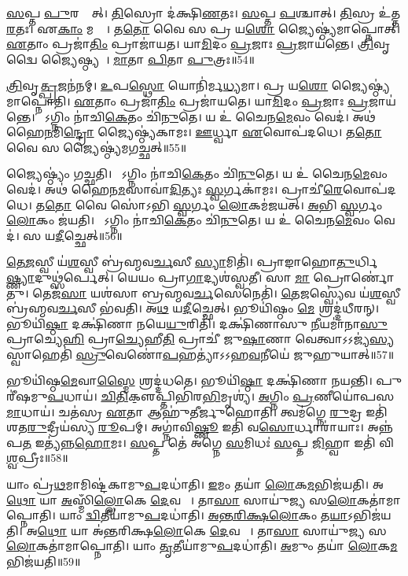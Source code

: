    \ul{𑌸}𑌪𑍍𑌤 \ul{𑌪𑍁}𑌰𑌸𑍍𑌤𑌾᳚𑌤𑍍।
   \ul{𑌤𑌿}𑌸𑍍𑌰𑍋 𑌦॑𑌕𑍍𑌷𑌿\ul{𑌣}𑌤𑌃।
   \ul{𑌸}𑌪𑍍𑌤 \ul{𑌪}𑌶𑍍𑌚𑌾𑌤𑍍।
   \ul{𑌤𑌿}𑌸𑍍𑌰 𑌉॑𑌤𑍍𑌤\ul{𑌰}𑌤𑌃।
   𑌏\ul{𑌕𑌾𑌂} 𑌮𑌧𑍍𑌯𑍇᳚।
   𑌤\ul{𑌤𑍋} 𑌵𑍈 𑌸 𑌪𑍍𑌰 𑌯\ul{𑌶𑍋} 𑌜𑍍𑌯𑍈𑌷𑍍𑌠𑍍𑌯॑𑌮𑌾𑌪𑍍𑌨𑍋𑌤𑍍।
   \ul{𑌏}𑌤𑌾𑌂 𑌪𑍍𑌰𑌜𑌾॑\ul{𑌤𑌿𑌂} 𑌪𑍍𑌰𑌾𑌜𑌾॑𑌯𑌤।
   𑌯𑌾\ul{𑌮𑌿}𑌦𑌂 \ul{𑌪𑍍𑌰}𑌜𑌾𑌃 \ul{𑌪𑍍𑌰}𑌜𑌾𑌯॑𑌨𑍍𑌤𑍇।
   \ul{𑌤𑍍𑌰𑌿}𑌵𑍃𑌦𑍍𑌵𑍈 𑌜𑍍𑌯𑍈𑌷𑍍𑌠𑍍𑌯𑌮𑍍᳚।
   \ul{𑌮𑌾}𑌤𑌾 \ul{𑌪𑌿}𑌤𑌾 \ul{𑌪𑍁}𑌤𑍍𑌰𑌃॥54॥

   \ul{𑌤𑍍𑌰𑌿}𑌵𑍃\ul{𑌤𑍍𑌪𑍍𑌰}𑌜𑌨॑𑌨𑌮𑍍।
   \ul{𑌉}𑌪\ul{𑌸𑍍𑌥𑍋} 𑌯𑍋𑌨𑌿॑𑌰𑍍𑌮\ul{𑌧𑍍𑌯}𑌮𑌾।
   𑌪𑍍𑌰 𑌯\ul{𑌶𑍋} 𑌜𑍍𑌯𑍈𑌷𑍍𑌠𑍍𑌯॑𑌮𑌾𑌪𑍍𑌨𑍋𑌤𑌿।
   \ul{𑌏}𑌤𑌾𑌂 𑌪𑍍𑌰𑌜𑌾॑\ul{𑌤𑌿𑌂} 𑌪𑍍𑌰𑌜𑌾॑𑌯𑌤𑍇।
   𑌯𑌾\ul{𑌮𑌿}𑌦𑌂 \ul{𑌪𑍍𑌰}𑌜𑌾𑌃 \ul{𑌪𑍍𑌰}𑌜𑌾𑌯॑𑌨𑍍𑌤𑍇।
   𑌯𑍋᳚𑌽𑌗𑍍𑌨𑌿𑌂 𑌨𑌾॑𑌚𑌿\ul{𑌕𑍇}𑌤𑌂 𑌚𑌿॑\ul{𑌨𑍁}𑌤𑍇।
   𑌯 𑌉॑ 𑌚𑍈𑌨\ul{𑌮𑍇}𑌵𑌂 𑌵𑍇𑌦॑।
   𑌅𑌥॑ 𑌹𑍈\ul{𑌨}𑌮𑌿\ul{𑌨𑍍𑌦𑍍𑌰𑍋} 𑌜𑍍𑌯𑍈𑌷𑍍𑌠𑍍𑌯॑𑌕𑌾𑌮𑌃।
   \ul{𑌊}𑌰𑍍𑌧𑍍𑌵𑌾 \ul{𑌏}𑌵𑍋𑌪॑𑌦𑌧𑍇।
   𑌤\ul{𑌤𑍋} 𑌵𑍈 𑌸 𑌜𑍍𑌯𑍈𑌷𑍍𑌠𑍍𑌯॑𑌮𑌗𑌚𑍍𑌛𑌤𑍍॥55॥

   𑌜𑍍𑌯𑍈𑌷𑍍𑌠𑍍𑌯𑌂॑ 𑌗𑌚𑍍𑌛𑌤𑌿।
   𑌯𑍋᳚𑌽𑌗𑍍𑌨𑌿𑌂 𑌨𑌾॑𑌚𑌿\ul{𑌕𑍇}𑌤𑌂 𑌚𑌿॑\ul{𑌨𑍁}𑌤𑍇।
   𑌯 𑌉॑ 𑌚𑍈𑌨\ul{𑌮𑍇}𑌵𑌂 𑌵𑍇𑌦॑।
   𑌅𑌥॑ 𑌹𑍈𑌨\ul{𑌮}𑌸𑌾𑌵𑌾॑\ul{𑌦𑌿}𑌤𑍍𑌯𑌃 \ul{𑌸𑍍𑌵}𑌰𑍍𑌗𑌕𑌾॑𑌮𑌃।
   𑌪𑍍𑌰𑌾𑌚𑍀॑\ul{𑌰𑍇}𑌵𑍋𑌪॑𑌦𑌧𑍇।
   𑌤\ul{𑌤𑍋} 𑌵𑍈 𑌸𑍋॑𑌽𑌭𑌿 \ul{𑌸𑍍𑌵}𑌰𑍍𑌗𑌂 \ul{𑌲𑍋}𑌕𑌮॑𑌜𑌯𑌤𑍍।
   \ul{𑌅}𑌭𑌿 \ul{𑌸𑍍𑌵}𑌰𑍍𑌗𑌂 \ul{𑌲𑍋}𑌕𑌂 𑌜॑𑌯𑌤𑌿।
   𑌯𑍋᳚𑌽𑌗𑍍𑌨𑌿𑌂 𑌨𑌾॑𑌚𑌿\ul{𑌕𑍇}𑌤𑌂 𑌚𑌿॑\ul{𑌨𑍁}𑌤𑍇।
   𑌯 𑌉॑ 𑌚𑍈𑌨\ul{𑌮𑍇}𑌵𑌂 𑌵𑍇𑌦॑।
   𑌸 𑌯\ul{𑌦𑍀}𑌚𑍍𑌛𑍇𑌤𑍍॥56॥

   \ul{𑌤𑍇}\ul{𑌜}𑌸𑍍𑌵𑍀 𑌯॑\ul{𑌶}𑌸𑍍𑌵𑍀 𑌬𑍍𑌰॑𑌹𑍍𑌮𑌵\ul{𑌰𑍍𑌚}𑌸𑍀 \ul{𑌸𑍍𑌯𑌾}𑌮𑌿𑌤𑌿॑।
   𑌪𑍍𑌰𑌾𑌙𑌾𑌹𑍋\ul{𑌤𑍁}𑌰𑍍𑌧𑌿\ul{𑌷𑍍𑌣𑍍𑌯𑌾}\-𑌦𑍁𑌥𑍍𑌸॑𑌰𑍍𑌪𑍇𑌤𑍍।
   𑌯𑍇𑌯𑌂 𑌪𑍍𑌰𑌾\ul{𑌗𑌾}𑌦𑍍𑌯𑌶॑𑌸𑍍𑌵𑌤𑍀।
   𑌸𑌾 \ul{𑌮𑌾} 𑌪𑍍𑌰𑍋𑌰𑍍𑌣𑍋॑𑌤𑍁।
   𑌤𑍇𑌜॑\ul{𑌸𑌾} 𑌯𑌶॑𑌸𑌾 𑌬𑍍𑌰𑌹𑍍𑌮𑌵\ul{𑌰𑍍𑌚}𑌸𑍇𑌨𑍇𑌤𑌿॑।
   \ul{𑌤𑍇}\ul{𑌜}𑌸𑍍𑌵𑍍𑌯𑍇॑𑌵 𑌯॑\ul{𑌶}𑌸𑍍𑌵𑍀 𑌬𑍍𑌰॑𑌹𑍍𑌮𑌵\ul{𑌰𑍍𑌚}𑌸𑍀 𑌭॑𑌵𑌤𑌿।
   𑌅\ul{𑌥} 𑌯\ul{𑌦𑍀}𑌚𑍍𑌛𑍇𑌤𑍍।
   𑌭𑍂𑌯𑌿॑𑌷𑍍𑌠𑌂 \ul{𑌮𑍇} 𑌶𑍍𑌰𑌦𑍍𑌦॑𑌧𑍀𑌰𑌨𑍍।
   𑌭𑍂𑌯𑌿॑\ul{𑌷𑍍𑌠𑌾} 𑌦𑌕𑍍𑌷𑌿॑𑌣𑌾 𑌨𑌯𑍇\ul{𑌯𑍁}𑌰𑌿𑌤𑌿॑।
   𑌦𑌕𑍍𑌷𑌿॑𑌣𑌾𑌸𑍁 \ul{𑌨𑍀}𑌯𑌮𑌾॑𑌨𑌾\ul{𑌸𑍁} 𑌪𑍍𑌰𑌾𑌚𑍍𑌯𑍇\ul{𑌹𑌿} 𑌪𑍍𑌰𑌾\ul{𑌚𑍍𑌯𑍇}𑌹𑍀\ul{𑌤𑌿} 𑌪𑍍𑌰𑌾𑌚𑍀॑ 𑌜𑍁\ul{𑌷𑌾}𑌣𑌾 𑌵𑍇𑌤𑍍𑌵𑌾𑌽𑌽𑌜𑍍𑌯॑\ul{𑌸𑍍𑌯} 𑌸𑍍𑌵𑌾𑌹𑍇𑌤𑌿॑ \ul{𑌸𑍍𑌰𑍁}𑌵𑍇𑌣𑍋॑\ul{𑌪}𑌹𑌤𑍍𑌯𑌾॑𑌽𑌽𑌹\ul{𑌵}𑌨𑍀𑌯𑍇॑ 𑌜𑍁𑌹𑍁𑌯𑌾𑌤𑍍॥57॥

   𑌭𑍂𑌯𑌿॑𑌷𑍍𑌠\ul{𑌮𑍇}𑌵𑌾\ul{𑌸𑍍𑌮𑍈} 𑌶𑍍𑌰𑌦𑍍𑌦॑𑌧𑌤𑍇।
   𑌭𑍂𑌯𑌿॑\ul{𑌷𑍍𑌠𑌾} 𑌦𑌕𑍍𑌷𑌿॑𑌣𑌾 𑌨𑌯𑌨𑍍𑌤𑌿।
   𑌪𑍁𑌰𑍀॑𑌷𑌮𑍁\ul{𑌪}𑌧𑌾𑌯॑।
   \ul{𑌚𑌿}\ul{𑌤𑌿}𑌕𑍢॒𑌪𑍍𑌤𑌿𑌭𑌿॑𑌰\ul{𑌭𑌿}𑌮𑍃𑌶𑍍𑌯॑।
   \ul{𑌅}𑌗𑍍𑌨𑌿𑌂 \ul{𑌪𑍍𑌰}𑌣𑍀𑌯𑍋॑𑌪\-𑌸\ul{𑌮𑌾}𑌧𑌾𑌯॑।
   𑌚𑌤॑𑌸𑍍𑌰 \ul{𑌏}𑌤𑌾 𑌆𑌹𑍁॑𑌤𑍀𑌰𑍍𑌜𑍁𑌹𑍋𑌤𑌿।
   𑌤𑍍𑌵𑌮॑𑌗𑍍𑌨𑍇 \ul{𑌰𑍁}𑌦𑍍𑌰 𑌇𑌤𑌿॑ 𑌶𑌤\ul{𑌰𑍁}𑌦𑍍𑌰𑍀𑌯॑𑌸𑍍𑌯 \ul{𑌰𑍂}𑌪𑌮𑍍।
   𑌅𑌗𑍍𑌨𑌾॑𑌵𑌿\ul{𑌷𑍍𑌣𑍂} 𑌇𑌤𑌿॑ 𑌵\ul{𑌸𑍋}𑌰𑍍𑌧𑌾𑌰𑌾॑𑌯𑌾𑌃।
   𑌅𑌨𑍍𑌨॑𑌪\ul{𑌤} 𑌇𑌤𑍍𑌯॑𑌨𑍍𑌨\ul{𑌹𑍋}𑌮𑌃।
   \ul{𑌸}𑌪𑍍𑌤 𑌤𑍇॑ 𑌅𑌗𑍍𑌨𑍇 \ul{𑌸}𑌮𑌿𑌧𑌃॑ \ul{𑌸}𑌪𑍍𑌤 \ul{𑌜𑌿}𑌹𑍍𑌵𑌾 𑌇𑌤𑌿॑ 𑌵𑌿\ul{𑌶𑍍𑌵}𑌪𑍍𑌰𑍀𑌃॥58॥
\anuvakamend
  
   𑌯𑌾𑌂 𑌪𑍍𑌰॑\ul{𑌥}𑌮𑌾𑌮𑌿𑌷𑍍𑌟॑𑌕𑌾𑌮𑍁\ul{𑌪}𑌦𑌧𑌾॑𑌤𑌿।
   \ul{𑌇}𑌮𑌂 𑌤𑌯𑌾॑ \ul{𑌲𑍋}𑌕\ul{𑌮}𑌭𑌿𑌜॑𑌯𑌤𑌿।
   𑌅\ul{𑌥𑍋} 𑌯𑌾 \ul{𑌅}𑌸𑍍𑌮𑌿𑌁\ul{𑌲𑍍𑌲𑍋}𑌕𑍇 \ul{𑌦𑍇}𑌵𑌤𑌾𑌃᳚।
   𑌤𑌾\ul{𑌸𑌾}\ul{} 𑌸𑌾𑌯𑍁॑𑌜𑍍𑌯 𑌸\ul{𑌲𑍋}𑌕𑌤𑌾॑𑌮𑌾𑌪𑍍𑌨𑍋𑌤𑌿।
   𑌯𑌾𑌂 \ul{𑌦𑍍𑌵𑌿}𑌤𑍀𑌯𑌾॑𑌮𑍁\ul{𑌪}𑌦𑌧𑌾॑𑌤𑌿।
   \ul{𑌅}\ul{𑌨𑍍𑌤}\ul{𑌰𑌿}\ul{𑌕𑍍𑌷}\ul{𑌲𑍋}𑌕𑌂 𑌤\ul{𑌯𑌾}𑌽𑌭𑌿𑌜॑𑌯𑌤𑌿।
   𑌅\ul{𑌥𑍋} 𑌯𑌾 𑌅॑𑌨𑍍𑌤𑌰𑌿𑌕𑍍𑌷\ul{𑌲𑍋}𑌕𑍇 \ul{𑌦𑍇}𑌵𑌤𑌾𑌃᳚।
   𑌤𑌾\ul{𑌸𑌾}\ul{} 𑌸𑌾𑌯𑍁॑𑌜𑍍𑌯 𑌸\ul{𑌲𑍋}𑌕𑌤𑌾॑𑌮𑌾𑌪𑍍𑌨𑍋𑌤𑌿।
   𑌯𑌾𑌂 \ul{𑌤𑍃}𑌤𑍀𑌯𑌾॑𑌮𑍁\ul{𑌪}𑌦𑌧𑌾॑𑌤𑌿।
   \ul{𑌅}𑌮𑍁𑌂 𑌤𑌯𑌾॑ \ul{𑌲𑍋}𑌕\ul{𑌮}𑌭𑌿𑌜॑𑌯𑌤𑌿॥59॥

